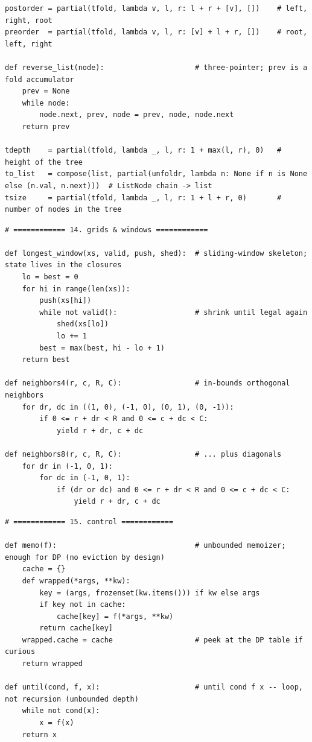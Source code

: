 \documentclass[11pt,letterpaper]{book}
\begin{document}
\begin{lstlisting}[style=code]
postorder = partial(tfold, lambda v, l, r: l + r + [v], [])    # left, right, root
preorder  = partial(tfold, lambda v, l, r: [v] + l + r, [])    # root, left, right

def reverse_list(node):                     # three-pointer; prev is a fold accumulator
    prev = None
    while node:
        node.next, prev, node = prev, node, node.next
    return prev

tdepth    = partial(tfold, lambda _, l, r: 1 + max(l, r), 0)   # height of the tree
to_list   = compose(list, partial(unfoldr, lambda n: None if n is None else (n.val, n.next)))  # ListNode chain -> list
tsize     = partial(tfold, lambda _, l, r: 1 + l + r, 0)       # number of nodes in the tree
\end{lstlisting}
\begin{lstlisting}[style=code]
# ============ 14. grids & windows ============

def longest_window(xs, valid, push, shed):  # sliding-window skeleton; state lives in the closures
    lo = best = 0
    for hi in range(len(xs)):
        push(xs[hi])
        while not valid():                  # shrink until legal again
            shed(xs[lo])
            lo += 1
        best = max(best, hi - lo + 1)
    return best

def neighbors4(r, c, R, C):                 # in-bounds orthogonal neighbors
    for dr, dc in ((1, 0), (-1, 0), (0, 1), (0, -1)):
        if 0 <= r + dr < R and 0 <= c + dc < C:
            yield r + dr, c + dc

def neighbors8(r, c, R, C):                 # ... plus diagonals
    for dr in (-1, 0, 1):
        for dc in (-1, 0, 1):
            if (dr or dc) and 0 <= r + dr < R and 0 <= c + dc < C:
                yield r + dr, c + dc
\end{lstlisting}
\begin{lstlisting}[style=code]
# ============ 15. control ============

def memo(f):                                # unbounded memoizer; enough for DP (no eviction by design)
    cache = {}
    def wrapped(*args, **kw):
        key = (args, frozenset(kw.items())) if kw else args
        if key not in cache:
            cache[key] = f(*args, **kw)
        return cache[key]
    wrapped.cache = cache                   # peek at the DP table if curious
    return wrapped

def until(cond, f, x):                      # until cond f x -- loop, not recursion (unbounded depth)
    while not cond(x):
        x = f(x)
    return x
\end{lstlisting}
\end{document}
